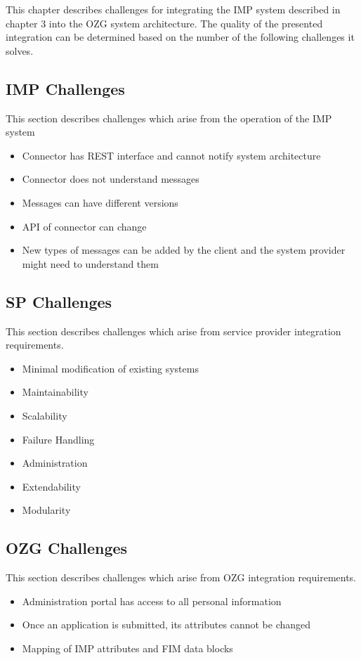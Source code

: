 This chapter describes challenges for integrating the IMP system described in chapter 3 into the OZG system architecture. The quality of the presented integration can be determined based on the number of the following challenges it solves.

\subsection{IMP Challenges}
This section describes challenges which arise from the operation of the IMP system

\begin{itemize}
    \item Connector has REST interface and cannot notify system architecture
    \item Connector does not understand messages
    \item Messages can have different versions
    \item API of connector can change
    \item New types of messages can be added by the client and the system provider might need to understand them
\end{itemize}

\subsection{SP Challenges}

This section describes challenges which arise from service provider integration requirements.

\begin{itemize}
    \item Minimal modification of existing systems
    \item Maintainability
    \item Scalability
    \item Failure Handling
    \item Administration
    \item Extendability
    \item Modularity
    
\end{itemize}

\subsection{OZG Challenges}

This section describes challenges which arise from OZG integration requirements.

\begin{itemize}
    \item Administration portal has access to all personal information
    \item Once an application is submitted, its attributes cannot be changed
    \item Mapping of IMP attributes and FIM data blocks
\end{itemize}